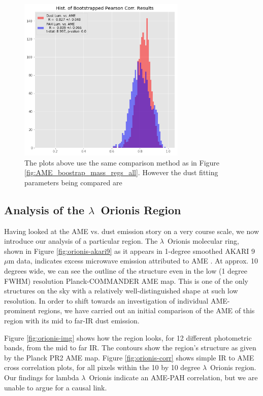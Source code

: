 \documentclass[preprint2,longabstract]{aastex}
\begin{document}
\begin{figure}
\includegraphics[width=80mm]{../Plots/AMEregs_bootstrap_PmassDlum_pearson_PR2.png}
\centering
\caption{The plots above use the same comparison method as in Figure \ref{fig:AME_boostrap_mass_regs_all}. However the dust fitting parameters being compared are }
\end{figure}



\subsection{Analysis of the $\lambda$~Orionis Region}

	Having looked at the AME vs. dust emission story on a very course scale, we now introduce our analysis of a particular region. The $\lambda$~Orionis molecular ring, shown in Figure \ref{fig:orionis-akari9} as it appears in 1-degree smoothed AKARI 9~$\mu$m data, indicates excess microwave emission attributed to AME \citep{planck15XXV}. At approx. 10 degrees wide, we can see the outline of the structure even in the low (1 degree FWHM) resolution Planck-COMMANDER AME map. This is one of the only structures on the sky with a relatively well-distinguished shape at such low resolution. In order to shift towards an investigation of individual AME-prominent regions, we have carried out an initial comparison of the AME of this region with its mid to far-IR dust emission.

	Figure \ref{fig:orionis-img} shows how the region looks, for 12 different photometric bands, from the mid to far IR. The contours show the region's structure as given by the Planck PR2 AME map. Figure \ref{fig:orionis-corr} shows simple IR to AME cross correlation plots, for all pixels within the 10 by 10 degree $\lambda$~Orionis region. Our findings for lambda $\lambda$~Orionis indicate an AME-PAH correlation, but we are unable to argue for a causal link.
\end{document}
